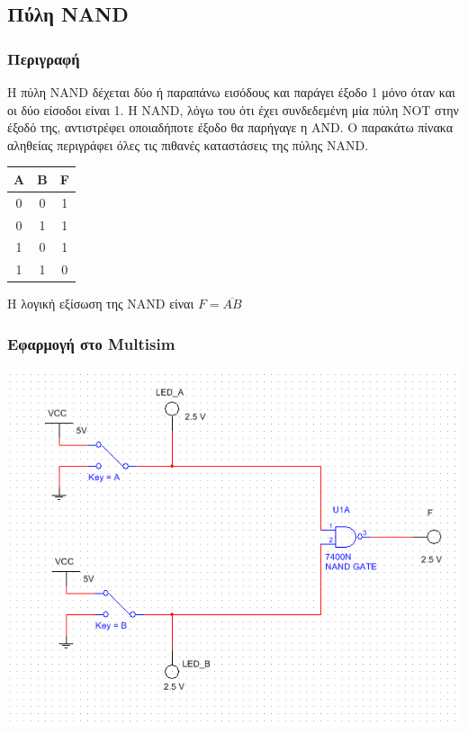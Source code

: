 \documentclass{article}
\begin{document}
\subsection{Πύλη NAND}
\subsubsection{Περιγραφή}

Η πύλη NAND δέχεται δύο ή παραπάνω εισόδους και παράγει έξοδο 1 μόνο όταν και οι
δύο είσοδοι είναι 1. Η NAND, λόγω του ότι έχει συνδεδεμένη μία πύλη NOT στην έξοδό
της, αντιστρέφει οποιαδήποτε έξοδο θα παρήγαγε η AND. Ο παρακάτω πίνακα αληθείας
περιγράφει όλες τις πιθανές καταστάσεις της πύλης NAND.

\begin{center}
\begin{tabular}{|c|c|c|}
	\hline
	A & B & F \\
	\hline
	0 & 0 & 1 \\
	0 & 1 & 1 \\
	1 & 0 & 1 \\
	1 & 1 & 0 \\
	\hline
\end{tabular}
\end{center}

Η λογική εξίσωση της NAND είναι $F = \overline{AB}$

\subsubsection{Εφαρμογή στο Multisim}
\includegraphics[width=\textwidth]{./res/nand.png}
\end{document}
